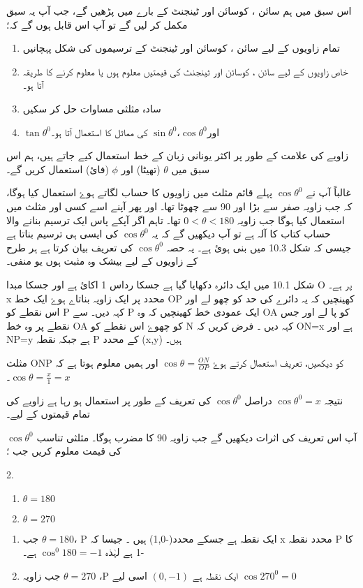 اس سبق میں ہم سائن ، کوسائن اور ٹینجنٹ کے بارے میں پڑھیں گے، جب آپ یہ سبق مکمل کر لیں گے تو آپ اس قابل ہوں گے کہ؛
\begin{enumerate}
\item
تمام زاویوں کے لیے سائن ، کوسائن اور ٹینجنٹ کے ترسیموں کی شکل پہچانیں  
\item
خاص زاویوں کے لیے سائن ، کوسائن اور ٹینجنٹ کی قیمتیں معلوم ہوں یا معلوم کرنے کا طریقہ آتا ہو۔
\item
سادہ مثلثی مساوات حل کر سکیں
\item
\(\tan{\theta}^{0}\)اور\(\cos{\theta}^{0}\)،\(\sin{\theta}^{0}\)
کی مماثل کا استعمال آتا ہو۔
\end{enumerate}


زاویے کی علامت کے طور پر اکثر یونانی زبان کے خط استعمال کیے جاتے ہیں، ہم اس سبق میں \(\theta\) (تھیٹا) اور \(\phi\) (فائ) استعمال کریں گے۔

غالباً آپ نے \(\cos{\theta}^{0}\) پہلے قائم مثلث میں زاویوں کا حساب لگاتے ہوۓ استعمال کیا ہوگا، کہ جب زاویہ صفر سے بڑا اور 90 سے چھوٹا تھا۔ اور پھر آپنے اسے کسی اور مثلث میں استعمال کیا ہوگا جب زاویہ \(0<\theta<180\) تھا۔ تاہم اگر آپکے پاس ایک ترسیم بنانے والا حساب کتاب کا آلہ ہے تو آپ دیکھیں گے کہ یہ \(\cos{\theta}^{0}\) کی ایسی ہی ترسیم بناتا ہے جیسی کہ شکل 10.3 میں بنی ہوئ ہے۔ یہ حصہ \(\cos{\theta}^{0}\) کی تعریف بیان کرتا ہے ہر طرح کے زاویوں کے لیے بیشک وہ مثبت ہوں یو منفی۔

شکل 10.1 میں ایک دائرہ دکھایا گیا ہے جسکا رداس 1 اکائ ہے اور جسکا مبدا O پر ہے۔ x محدد پر ایک زاویہ بناتاے ہوۓ ایک خط OP کھینچیں کہ یہ دائرے کی حد کو چھو لے اور اس نقطے کو P کہہ دیں۔  سے P ایک عمودی خط کھینچیں کہ وہ  OA کو پا لے اور جس نقطے پر وہ خط  OA    کو چھوۓ اس نقطے کو N کہہ دیں ۔ فرض کریں کہ  ON=x  ہے اور  NP=y   ہے 
جبکہ نقطہ   P کے محدد  (x,y) ہیں۔

مثلث ONP کو دیکھیں، تعریف استعمال کرتے ہوۓ \(\cos\theta=\frac{ON}{OP}\) اور ہمیں معلوم ہوتا ہے کہ \(\cos\theta=\frac{x}{1}=x\)۔

نتیجہ \(\cos{\theta}^{0}=x\) دراصل \(\cos{\theta}^{0}\)  کی تعریف کے طور پر استعمال ہو رہا ہے زاویے کی تمام قیمتوں کے لیے۔

آپ اس تعریف کی اثرات دیکھیں گے جب زاویہ 90 کا مضرب ہوگا۔
مثلثی تناسب \(\cos{\theta}^{0}\) کی قیمت معلوم کریں جب ؛
\begin{multicols}{2.}
\begin{enumerate}
\item \(\theta=180\)
\item  \(\theta=270\)
\end{enumerate}
\end{multicols}
\begin{enumerate}
\item
  جب \(\theta=180\)، P ایک نقطہ ہے جسکے محدد(-1,0) ہیں ۔ جیسا کہ x محدد نقطہ P  کا -1 ہے لہٰذہ \(\cos^{0}180=-1\) ہے۔
\item  
جب زاویہ \(\theta=270\) ،P  ایک نقطہ ہے \((0,-1)\) اسی لیے \(\cos270^{0}=0\)
\end{enumerate}


